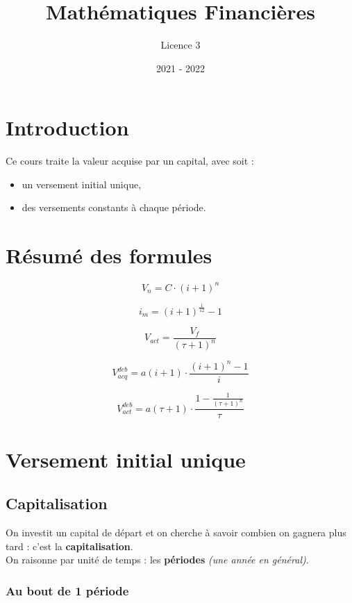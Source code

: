 \documentclass{article}
\title{Mathématiques Financières}
\author{Licence 3}
\date{2021 - 2022}
\begin{document}
\normalsize
\maketitle

\renewcommand*\contentsname{Table des matières}
\tableofcontents
\newpage

\section{Introduction}
Ce cours traite la valeur acquise par un capital, avec soit :


\begin{itemize}
   \item un versement initial unique,
   \item des versements constants à chaque période.
\end{itemize}

\section{Résumé des formules}

{
\large
$$ V_n = C\cdot(i+1)^n$$

$$i_m = (i+1)^{\frac{1}{12}} - 1$$

$$V_{act} = \dfrac{V_f}{(\tau+1)^n}$$

$$V^{deb}_{acq} = a(i+1)\cdot\dfrac{(i+1)^n-1}{i}$$

$$V^{deb}_{act} = a(\tau+1)\cdot\dfrac{1-\frac{1}{(\tau+1)^n}}{\tau}$$
}




\newpage
\section{Versement initial unique}

\subsection{Capitalisation}
On investit un capital de départ et on cherche à savoir combien on gagnera plus tard : c'est la \textbf{capitalisation}. 
\\ On raisonne par unité de temps : les  \textbf{périodes} \textit{(une année en général)}.

\subsubsection{Au bout de 1 période}
\end{document}
